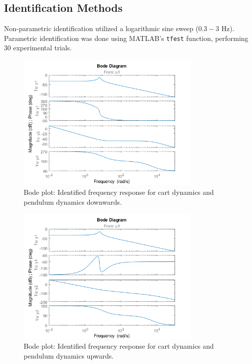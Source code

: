 \documentclass[12pt]{article}
\begin{document}
\subsection{Identification Methods}

Non-parametric identification utilized a logarithmic sine sweep ($0.3-3$ Hz). Parametric identification was done using MATLAB's \texttt{tfest} function, performing 30 experimental trials.

\begin{figure}[H]
    \centering
    \includegraphics[width=0.8\textwidth]{../plots/bode_down.png}
    \caption{Bode plot: Identified frequency response for cart dynamics and pendulum dynamics downwards.}
    \label{fig:bode_down}
\end{figure}

\begin{figure}[H]
    \centering
    \includegraphics[width=0.8\textwidth]{../plots/bode_up.png}
    \caption{Bode plot: Identified frequency response for cart dynamics and pendulum dynamics upwards.}
    \label{fig:bode_up}
\end{figure}
\end{document}
